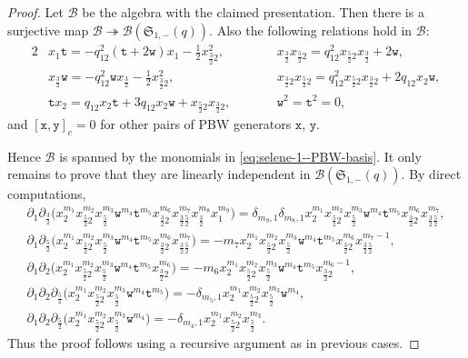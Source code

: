 \documentclass[pdftex]{sigma}
\numberwithin{equation}{section}
\newcommand{\toba}{\mathscr B}
\newcommand{\sele}{\mathfrak{S}}
\newcommand{\ttt}{\mathtt{t}}
\newcommand{\wt}{\mathtt{w}}
\newcommand{\xt}{\mathtt{x}}
\newcommand{\yt}{\mathtt{y}}
\newcommand{\tresdos}{\frac{3}{2}}
\newcommand{\cincodos}{\frac{5}{2}}
\begin{document}
\begin{proof}
Let $\toba$ be the algebra with the claimed presentation. Then
there is a surjective map $\toba \twoheadrightarrow \toba(\sele_{1,-}(q))$.
Also the following relations hold in $\toba$:{\samepage
\begin{alignat*}{2}
&x_1\ttt =-q_{12}^2(\ttt+2\wt)x_1 -\tfrac{1}{2}x_{\tresdos2}^2,
&&x_{\tresdos}x_{\cincodos2} = q_{12}^2x_{\cincodos2}x_{\tresdos}+2\wt,
\\
&x_\tresdos\wt =-q_{12}^2\wt x_{\tresdos} -\tfrac{1}{2}x_{\tresdos2}^2,
&&x_{\tresdos2}x_{\cincodos2} = q_{12}^2x_{\cincodos2}x_{\tresdos2}+2q_{12}x_2\wt,
\\
&\ttt x_{2} = q_{12}x_2\ttt+3q_{12}x_2\wt+x_{\cincodos2}x_{\tresdos2},\qquad
&&\wt^2 = \ttt^2 =0,
\end{alignat*}}
and $[\xt,\yt]_c=0$ for other pairs of PBW generators $\xt$, $\yt$.

Hence $\toba$ is spanned by the monomials in \eqref{eq:selene-1--PBW-basis}.
It only remains to prove that they are linearly independent in $\toba(\sele_{1,-}(q))$. By direct computations,
\begin{gather*}
\partial_1\partial_{\tresdos} \big(x_{2}^{m_1}x_{\cincodos2}^{m_2}x_{\cincodos}^{m_3}\wt^{m_4}\ttt^{m_5} x_{\tresdos2}^{m_6}x_{\tresdos\cincodos}^{m_7} x_{\tresdos}^{m_8} x_1^{m_9} \big)
=\delta_{m_9,1}\delta_{m_8,1} x_{2}^{m_1}x_{\cincodos2}^{m_2}x_{\cincodos}^{m_3}\wt^{m_4}\ttt^{m_5} x_{\tresdos2}^{m_6}x_{\tresdos\cincodos}^{m_7},
\\
\partial_1\partial_{\cincodos} \big(x_{2}^{m_1}x_{\cincodos2}^{m_2}x_{\cincodos}^{m_3}\wt^{m_4}\ttt^{m_5} x_{\tresdos2}^{m_6}x_{\tresdos\cincodos}^{m_7} \big)
=-m_7 x_{2}^{m_1}x_{\cincodos2}^{m_2}x_{\cincodos}^{m_3}\wt^{m_4}\ttt^{m_5} x_{\tresdos2}^{m_6}x_{\tresdos\cincodos}^{m_7-1},
\\
\partial_1\partial_{2} \big(x_{2}^{m_1}x_{\cincodos2}^{m_2}x_{\cincodos}^{m_3}\wt^{m_4}\ttt^{m_5} x_{\tresdos2}^{m_6} \big)
= -m_6 x_{2}^{m_1}x_{\cincodos2}^{m_2}x_{\cincodos}^{m_3}\wt^{m_4}\ttt^{m_5} x_{\tresdos2}^{m_6-1},
\\
\partial_1\partial_{2}\partial_{\cincodos} \big(x_{2}^{m_1}x_{\cincodos2}^{m_2}x_{\cincodos}^{m_3}\wt^{m_4}\ttt^{m_5}\big)
= -\delta_{m_5,1} x_{2}^{m_1}x_{\cincodos2}^{m_2}x_{\cincodos}^{m_3}\wt^{m_4},
\\
\partial_1\partial_{2}\partial_{\cincodos} \big(x_{2}^{m_1}x_{\cincodos2}^{m_2}x_{\cincodos}^{m_3}\wt^{m_4}\big)
= -\delta_{m_4,1} x_{2}^{m_1}x_{\cincodos2}^{m_2}x_{\cincodos}^{m_3}.
\end{gather*}
Thus the proof follows using a recursive argument as in previous cases.
\end{proof}
\end{document}
